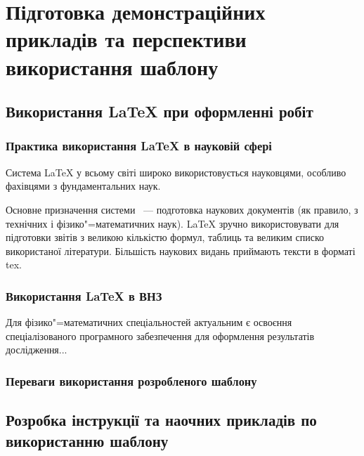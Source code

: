 \chapter{Підготовка демонстраційних прикладів та перспективи використання шаблону} 
\label{chap:first}

\section{Використання \LaTeX{} при оформленні робіт}

\subsection{Практика використання \LaTeX{} в науковій сфері}

Система \LaTeX{} у всьому світі широко використовується науковцями, особливо фахівцями з фундаментальних наук.

Основне призначення системи ~--- подготовка наукових документів (як правило, з технічних і фізико"=математичних наук). \LaTeX{} зручно використовувати для підготовки звітів з великою кількістю формул, таблиць та великим списко використаної літератури. Більшість наукових видань приймають тексти в форматі tex.

\subsection{Використання \LaTeX{} в ВНЗ}

Для фізико"=математичних спеціальностей актуальним є освоєння спеціалізованого програмного забезпечення для оформлення результатів дослідження...

\subsection{Переваги використання розробленого шаблону}


\section{Розробка інструкції та наочних прикладів по використанню шаблону}



